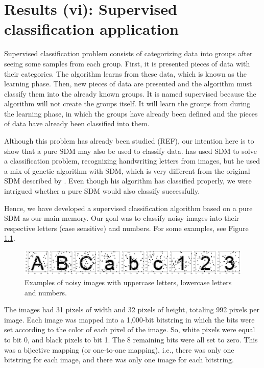 
\chapter{Results (vi): Supervised classification application}

Supervised classification problem consists of categorizing data into groups after seeing some samples from each group. First, it is presented pieces of data with their categories. The algorithm learns from these data, which is known as the learning phase. Then, new pieces of data are presented and the algorithm must classify them into the already known groups. It is named supervised because  the algorithm will not create the groups itself. It will learn the groups from during the learning phase, in which the groups have already been defined and the pieces of data have already been classified into them.

Although this problem has already been studied (REF), our intention here is to show that a pure SDM may also be used to classify data. \citet{fan1997genetic} has used SDM to solve a classification problem, recognizing handwriting letters from images, but he used a mix of genetic algorithm with SDM, which is very different from the original SDM described by \cite{Kanerva1988}. Even though his algorithm has classified properly, we were intrigued whether a pure SDM would also classify successfully.

Hence, we have developed a supervised classification algorithm based on a pure SDM as our main memory. Our goal was to classify noisy images into their respective letters (case sensitive) and numbers. For some examples, see Figure \ref{fig-classification-examples}.

\begin{figure}[!htb]
\centering\includegraphics[width=\textwidth]{./images02/classification/example.png}
\caption{Examples of noisy images with uppercase letters, lowercase letters and numbers.
\label{fig-classification-examples}}
\end{figure}

The images had 31 pixels of width and 32 pixels of height, totaling 992 pixels per image. Each image was mapped into a 1,000-bit bitstring in which the bits were set according to the color of each pixel of the image. So, white pixels were equal to bit 0, and black pixels to bit 1. The 8 remaining bits were all set to zero. This was a bijective mapping (or one-to-one mapping), i.e., there was only one bitstring for each image, and there was only one image for each bitstring.


